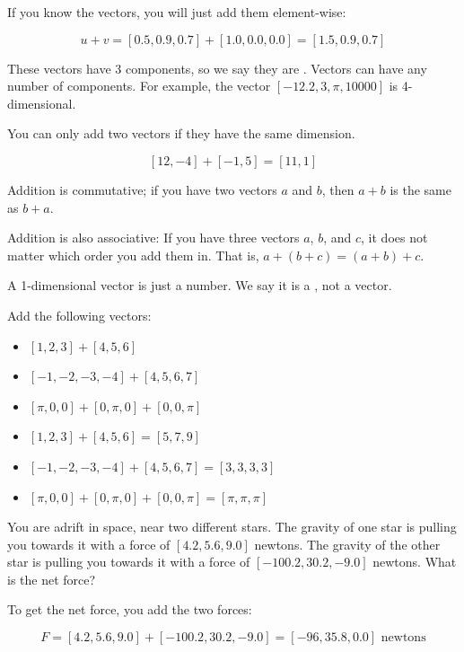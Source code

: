 If you know the vectors, you will just add them element-wise:

$$ u + v = [0.5, 0.9, 0.7] + [1.0, 0.0, 0.0] = [1.5, 0.9, 0.7] $$

These vectors have 3 components, so we say they are . 
Vectors can have any number of components. For example, the vector
 $[-12.2, 3, \pi, 10000]$ is 4-dimensional.

 You can only add two vectors if they have the same dimension.

 $$ [12, -4] + [-1, 5] = [11,1] $$

 Addition is commutative; if you have two vectors $a$ and $b$, then
 $a + b$ is the same as $b + a$.

 Addition is also associative: If you have three vectors $a$, $b$, and $c$,
 it does not matter which order you add them in. 
 That is, $a + (b + c) = (a + b) + c$.

 A 1-dimensional vector is just a number. We say it is a 
 , not a vector.

 \begin{Exercise}[title={Adding vectors}, label=adding_vectors]
Add the following vectors:
\begin{itemize}
    \item $[1, 2, 3] + [4, 5, 6]$
    \item $[-1, -2, -3, -4] + [4, 5, 6, 7]$
    \item $[\pi, 0, 0] + [0, \pi, 0] + [0, 0, \pi]$
\end{itemize}
\end{Exercise}
\begin{Answer}[ref=adding_vectors]
    \begin{itemize}
        \item $[1, 2, 3] + [4, 5, 6] = [5, 7, 9]$
        \item $[-1, -2, -3, -4] + [4, 5, 6, 7] = [3, 3, 3, 3]$
        \item $[\pi, 0, 0] + [0, \pi, 0] + [0, 0, \pi] = [\pi, \pi, \pi]$ 
    \end{itemize}
\end{Answer}

    \begin{Exercise}[title={Adding Forces}, label=adding_forces]
        You are adrift in space, near two different stars. 
        The gravity of one star is pulling you towards it with a 
        force of $[4.2, 5.6, 9.0]$ newtons.
        The gravity of the other star is pulling you towards it with
        a force of $[-100.2, 30.2, -9.0]$ newtons. What is the net force?
        \end{Exercise}
        \begin{Answer}[ref=adding_forces]
            To get the net force, you add the two forces:

            $$F = [4.2, 5.6, 9.0] + [-100.2, 30.2, -9.0] = [-96, 35.8, 0.0] 
            \text{ newtons}$$
   
\end{Answer}

